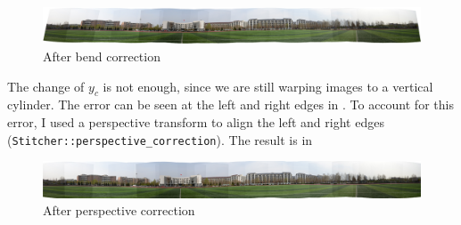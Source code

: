 \begin{figure}[H]
  \centering
  \includegraphics[width=\textwidth]{res/unbend.jpg}
  \caption{After bend correction\label{fig:unbend}}
\end{figure}

The change of $y_c$ is not enough, since we are still warping
images to a vertical cylinder.
The error can be seen at the left and right edges in .
To account for this error, I used a perspective transform
to align the left and right edges (\verb|Stitcher::perspective_correction|). The result is in 
\begin{figure}[H]
  \centering
  \includegraphics[width=\textwidth]{res/unbend-persp.jpg}
  \caption{After perspective correction \label{fig:unbend-persp}}
\end{figure}

